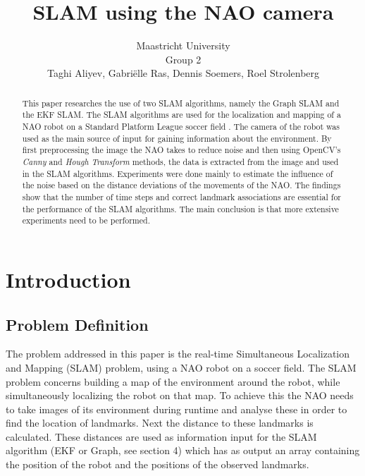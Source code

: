 \documentclass{ba-kecs}
\title{SLAM using the NAO camera}
\author{Maastricht University \\ Group 2 \\ Taghi Aliyev, Gabri\"elle Ras, Dennis Soemers, Roel Strolenberg}
\numberwithin{figure}{section}
\numberwithin{equation}{section}
\begin{document}
\maketitle


\begin{abstract}

This paper researches the use of two SLAM algorithms, namely the Graph SLAM and the EKF SLAM. The SLAM algorithms are used for the localization and mapping of a NAO robot on a Standard Platform League soccer field \cite{cd1}. The camera of the robot was used as the main source of input for gaining information about the environment. By first preprocessing the image the NAO takes to reduce noise and then using OpenCV's \emph{Canny} and \emph{Hough Transform} methods, the data is extracted from the image and used in the SLAM algorithms. Experiments were done mainly to estimate the influence of the noise based on the distance deviations of the movements of the NAO. The findings show that the number of time steps and correct landmark associations are essential for the performance of the SLAM algorithms. The main conclusion is that more extensive experiments need to be performed. 


\end{abstract}


\section{Introduction}


\subsection{Problem Definition}
The problem addressed in this paper is the real-time Simultaneous Localization and Mapping (SLAM) problem, using a NAO robot on a soccer field. The SLAM problem concerns building a map of the environment around the robot, while simultaneously localizing the robot on that map. To achieve this the NAO needs to take images of its environment during runtime and analyse these in order to find the location of landmarks. Next the distance to these landmarks is calculated. These distances are used as information input for the SLAM algorithm (EKF or Graph, see section 4) which has as output an array containing the position of the robot and the positions of the observed landmarks.
\end{document}
